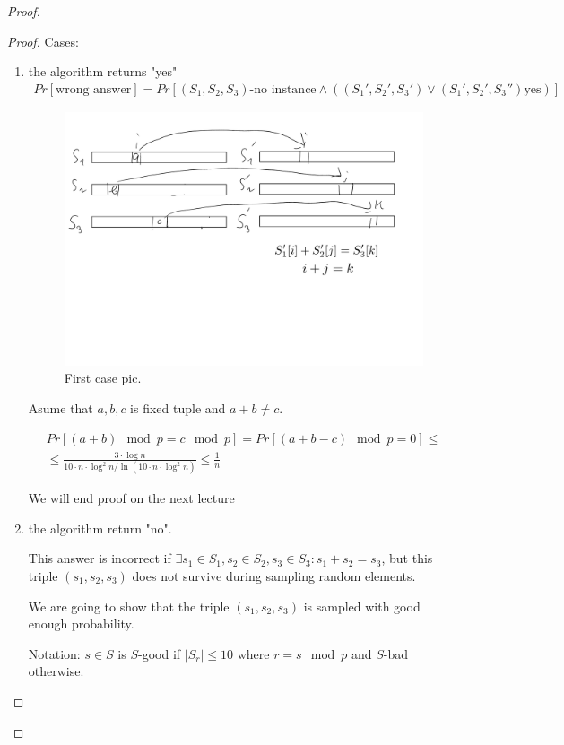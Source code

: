 \begin{proof}
\begin{proof}
	Cases:
	\begin{enumerate}
	  \item the algorithm returns "yes"
		\begin{align*}
		  Pr[\text{wrong answer}] = Pr[(S_1, S_2, S_3) \text{-no instance} \land ((S_1', S_2', S_3') \lor (S_1', S_2', S_3'') \text{yes}) ]
		\end{align*}
		\begin{figure}[ht]
		  \center
		  \includegraphics[scale=0.3]{figures/3.pdf}
		  \caption{First case pic.}
		\end{figure}


		Asume that $a, b, c$ is fixed tuple and $a + b \neq c$.

		\begin{align*}
		  Pr[(a + b) \mod p = c \mod p] = Pr[(a + b - c) \mod p = 0] \leq \\
		  \leq \frac{3 \cdot \log n}{10 \cdot n \cdot \log^2 n / \ln(10 \cdot n \cdot \log^2 n)} \leq \frac{1}{n}
		\end{align*}

		{\color{red} We will end proof on the next lecture}

	  \item the algorithm return "no".

		This answer is incorrect if $\exists s_1 \in S_1, s_2 \in S_2, s_3 \in S_3 : s_1 + s_2 = s_3$, but this triple $(s_1, s_2, s_3)$ does not survive during sampling random elements.

		We are going to show that the triple $(s_1, s_2, s_3)$ is sampled with good enough probability.

		Notation: $s \in S$ is $S$-good if $|S_r| \leq 10$ where $r = s \mod p$ and $S$-bad otherwise.


\end{enumerate}
\end{proof}
\end{proof}
